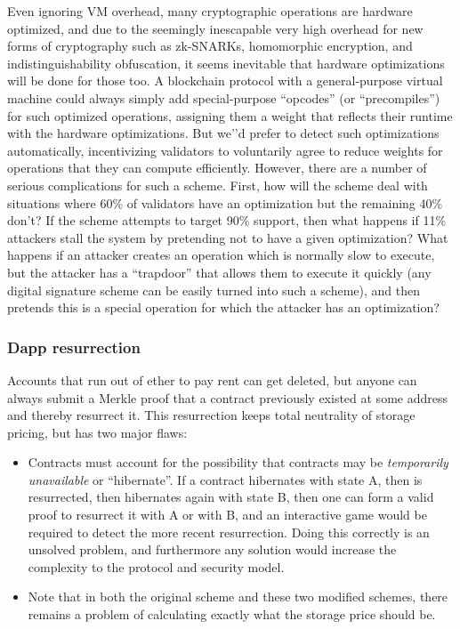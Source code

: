 \documentclass[12pt, final]{article}
\begin{document}
Even ignoring VM overhead, many cryptographic operations are hardware optimized, and due to the seemingly inescapable very high overhead for new forms of cryptography such as zk-SNARKs, homomorphic encryption, and indistinguishability obfuscation, it seems inevitable that hardware optimizations will be done for those too. A blockchain protocol with a general-purpose virtual machine could always simply add special-purpose ``opcodes'' (or ``precompiles'') for such optimized operations, assigning them a weight that reflects their runtime with the hardware optimizations. But we'’d prefer to detect such optimizations automatically, incentivizing validators to voluntarily agree to reduce weights for operations that they can compute efficiently. However, there are a number of serious complications for such a scheme. First, how will the scheme deal with situations where 60\% of validators have an optimization but the remaining 40\% don't? If the scheme attempts to target 90\% support, then what happens if 11\% attackers stall the system by pretending not to have a given optimization? What happens if an attacker creates an operation which is normally slow to execute, but the attacker has a ``trapdoor'' that allows them to execute it quickly (any digital signature scheme can be easily turned into such a scheme), and then pretends this is a special operation for which the attacker has an optimization?


\subsubsection{Dapp resurrection}

Accounts that run out of ether to pay rent can get deleted, but anyone can always submit a Merkle proof that a contract previously existed at some address and thereby resurrect it. This resurrection keeps total neutrality of storage pricing, but has two major flaws:

\begin{itemize}
\item Contracts must account for the possibility that contracts may be \emph{temporarily unavailable} or ``hibernate''. 
If a contract hibernates with state A, then is resurrected, then hibernates again with state B, then one can form a valid proof to resurrect it with A or with B, and an interactive game would be required to detect the more recent resurrection. Doing this correctly is an unsolved problem, and furthermore any solution would increase the complexity to the protocol and security model.

\item Note that in both the original scheme and these two modified schemes, there remains a problem of calculating exactly what the storage price should be.
\end{itemize}
\end{document}
